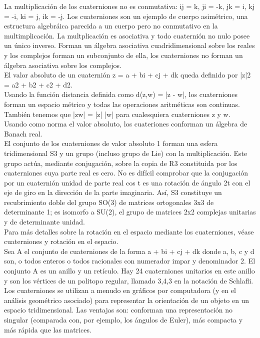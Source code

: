 \documentclass[12pt,a4paper]{article}
\begin{document}
La multiplicación de los cuaterniones no es conmutativa: ij = k, ji = -k, jk = i, kj = -i, ki = j, ik = -j. Los cuaterniones son un ejemplo de cuerpo asimétrico, una estructura algebráica parecida a un cuerpo pero no conmutativo en la multimplicación. La multplicación es asociativa y todo cuaternión no nulo posee un único inverso. Forman un álgebra asociativa cuadridimensional sobre los reales y los complejos forman un subconjunto de ella, los cuaterniones no forman un álgebra asociativa sobre los complejos.\\
El valor absoluto de un cuaternión z = a + bi + cj + dk queda definido por |z|2 = a2 + b2 + c2 + d2.\\
Usando la función distancia definida como d(z,w) = |z - w|, los cuaterniones forman un espacio métrico y todas las operaciones aritméticas son continuas.\\
También tenemos que |zw| = |z| |w| para cualesquiera cuaterniones z y w.\\
Usando como norma el valor absoluto, los cuateriones conforman un álgebra de Banach real.\\
El conjunto de los cuaterniones de valor absoluto 1 forman una esfera tridimensional S3 y un grupo (incluso grupo de Lie) con la multiplicación. Este grupo actúa, mediante conjugación, sobre la copia de R3 constituida por los cuaterniones cuya parte real es cero. No es difícil comprobar que la conjugación por un cuaternión unidad de parte real cos t es una rotación de ángulo 2t con el eje de giro en la dirección de la parte imaginaria. Así, S3 constituye un recubrimiento doble del grupo SO(3) de matrices ortogonales 3x3 de determinante 1; es isomorfo a SU(2), el grupo de matrices 2x2 complejas unitarias y de determinante unidad.\\
Para más detalles sobre la rotación en el espacio mediante los cuaterniones, véase cuaterniones y rotación en el espacio.\\
Sea A el conjunto de cuaterniones de la forma a + bi + cj + dk donde a, b, c y d son, o todos enteros o todos racionales con numerador impar y denominador 2. El conjunto A es un anillo y un retículo. Hay 24 cuaterniones unitarios en este anillo y son los vértices de un politopo regular, llamado {3,4,3} en la notación de Schlafli.\\
Los cuaterniones se utilizan a menudo en gráficos por computadora (y en el análisis geométrico asociado) para representar la orientación de un objeto en un espacio tridimensional. Las ventajas son: conforman una representación no singular (comparada con, por ejemplo, los ángulos de Euler), más compacta y más rápida que las matrices.\\
\end{document}
